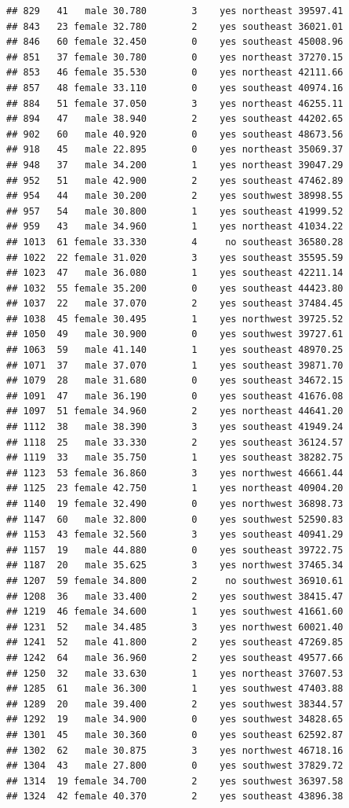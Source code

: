 \documentclass[
]{article}
\begin{document}
\begin{verbatim}
## 829   41   male 30.780        3    yes northeast 39597.41
## 843   23 female 32.780        2    yes southeast 36021.01
## 846   60 female 32.450        0    yes southeast 45008.96
## 851   37 female 30.780        0    yes northeast 37270.15
## 853   46 female 35.530        0    yes northeast 42111.66
## 857   48 female 33.110        0    yes southeast 40974.16
## 884   51 female 37.050        3    yes northeast 46255.11
## 894   47   male 38.940        2    yes southeast 44202.65
## 902   60   male 40.920        0    yes southeast 48673.56
## 918   45   male 22.895        0    yes northeast 35069.37
## 948   37   male 34.200        1    yes northeast 39047.29
## 952   51   male 42.900        2    yes southeast 47462.89
## 954   44   male 30.200        2    yes southwest 38998.55
## 957   54   male 30.800        1    yes southeast 41999.52
## 959   43   male 34.960        1    yes northeast 41034.22
## 1013  61 female 33.330        4     no southeast 36580.28
## 1022  22 female 31.020        3    yes southeast 35595.59
## 1023  47   male 36.080        1    yes southeast 42211.14
## 1032  55 female 35.200        0    yes southeast 44423.80
## 1037  22   male 37.070        2    yes southeast 37484.45
## 1038  45 female 30.495        1    yes northwest 39725.52
## 1050  49   male 30.900        0    yes southwest 39727.61
## 1063  59   male 41.140        1    yes southeast 48970.25
## 1071  37   male 37.070        1    yes southeast 39871.70
## 1079  28   male 31.680        0    yes southeast 34672.15
## 1091  47   male 36.190        0    yes southeast 41676.08
## 1097  51 female 34.960        2    yes northeast 44641.20
## 1112  38   male 38.390        3    yes southeast 41949.24
## 1118  25   male 33.330        2    yes southeast 36124.57
## 1119  33   male 35.750        1    yes southeast 38282.75
## 1123  53 female 36.860        3    yes northwest 46661.44
## 1125  23 female 42.750        1    yes northeast 40904.20
## 1140  19 female 32.490        0    yes northwest 36898.73
## 1147  60   male 32.800        0    yes southwest 52590.83
## 1153  43 female 32.560        3    yes southeast 40941.29
## 1157  19   male 44.880        0    yes southeast 39722.75
## 1187  20   male 35.625        3    yes northwest 37465.34
## 1207  59 female 34.800        2     no southwest 36910.61
## 1208  36   male 33.400        2    yes southwest 38415.47
## 1219  46 female 34.600        1    yes southwest 41661.60
## 1231  52   male 34.485        3    yes northwest 60021.40
## 1241  52   male 41.800        2    yes southeast 47269.85
## 1242  64   male 36.960        2    yes southeast 49577.66
## 1250  32   male 33.630        1    yes northeast 37607.53
## 1285  61   male 36.300        1    yes southwest 47403.88
## 1289  20   male 39.400        2    yes southwest 38344.57
## 1292  19   male 34.900        0    yes southwest 34828.65
## 1301  45   male 30.360        0    yes southeast 62592.87
## 1302  62   male 30.875        3    yes northwest 46718.16
## 1304  43   male 27.800        0    yes southwest 37829.72
## 1314  19 female 34.700        2    yes southwest 36397.58
## 1324  42 female 40.370        2    yes southeast 43896.38
\end{verbatim}
\end{document}
